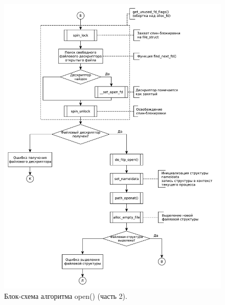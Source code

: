\begin{figure}[H]
    \centering
    \includegraphics[scale=0.6]{data/newpdg/open_2rolaned.pdf}
    \caption{Блок-схема алгоритма open() (часть 2).}
\end{figure}

